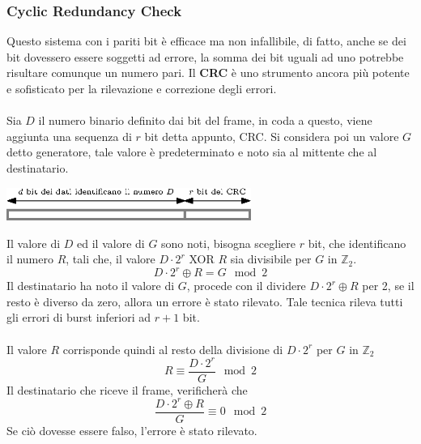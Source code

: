\documentclass[12pt, letterpaper]{article}
\newcommand{\acc}{\\\hphantom{}\\}
\begin{document}
\subsubsection{Cyclic Redundancy Check}\label{CRC}
Questo sistema con i pariti bit è efficace ma non infallibile, di fatto, anche se dei bit dovessero essere soggetti 
ad errore, la somma dei bit uguali ad uno potrebbe risultare comunque un numero pari.
Il \textbf{CRC} è uno strumento ancora più potente e sofisticato per la rilevazione e correzione degli errori.\acc 
Sia $D$ il numero binario definito dai bit del frame, in coda a questo, viene aggiunta una sequenza di $r$ 
bit detta appunto, CRC. Si considera poi un valore $G$ detto generatore, tale valore è predeterminato e noto sia al 
mittente che al destinatario.\begin{center}
    \includegraphics[width=0.6\textwidth ]{images/crcBit.eps}
\end{center} 
Il valore di $D$ ed il valore di $G$ sono noti, bisogna scegliere $r$ bit, che identificano il numero $R$, tali che, 
il valore $D\cdot 2^r$  XOR $R$ sia divisibile per $G$ in $\mathbb{Z}_2$.
$$ D\cdot 2^r \oplus R = G \mod{2}$$ 
Il destinatario ha noto il valore di $G$, procede con il dividere $D\cdot 2^r \oplus R$ per 2, se il resto è 
diverso da zero, allora un errore è stato rilevato. Tale tecnica rileva tutti gli errori di burst inferiori 
ad $r+1$ bit.\acc 
Il valore $R$ corrisponde quindi al resto della divisione di $D\cdot 2^r$ per $G$ in $\mathbb{Z}_2$ 
$$ R\equiv \dfrac{D\cdot 2^r}{G}\mod{2}$$
Il destinatario che riceve il frame, verificherà che $$\dfrac{D\cdot 2^r \oplus R}{G}\equiv 0 \mod{2} $$ 
Se ciò dovesse essere falso, l'errore è stato rilevato.
\end{document}
